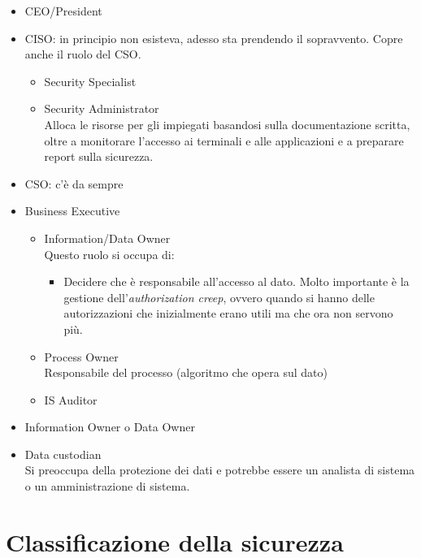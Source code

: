 \begin{itemize}
  \item CEO/President \\
  \item CISO: in principio non esisteva, adesso sta prendendo il sopravvento. Copre anche il ruolo del CSO.
  \begin{itemize}
	\item Security Specialist
	\item Security Administrator \\
	Alloca le risorse per gli impiegati basandosi sulla documentazione scritta, 
  oltre a monitorare l'accesso ai terminali e alle applicazioni e a preparare 
  report sulla sicurezza.
  \end{itemize}
  \item CSO: c'è da sempre
  \item Business Executive
  \begin{itemize}
  \item Information/Data Owner \\
  Questo ruolo si occupa di:
  \begin{itemize}
    \item Decidere che è responsabile all'accesso al dato. Molto importante è 
    la gestione dell'\textit{authorization creep}, ovvero quando si hanno delle 
    autorizzazioni che inizialmente erano utili ma che ora non servono più.
  \end{itemize}
  \item Process Owner \\
  Responsabile del processo (algoritmo che opera sul dato)
  \item IS Auditor \\
\end{itemize}
  \item Information Owner o Data Owner \\
  
  \item Data custodian \\
  Si preoccupa della protezione dei dati e potrebbe essere un analista di 
  sistema o un amministrazione di sistema.
  
\end{itemize}

\section{Classificazione della sicurezza}

